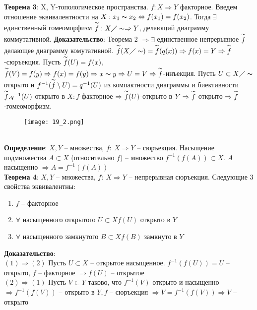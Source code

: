 	\textbf{Теорема 3}: X, Y-топологическое  пространства. $f: X \Rightarrow Y$ факторное. Введем отношение эквивалентности на $X: x_1 \thicksim x_2 \Leftrightarrow f(x_1) = f(x_2)$. Тогда $\exists$ единственный гомеоморфизм $\overset{\thicksim}{f} : X\diagup \thicksim \Rightarrow Y$, делающий диаграмму коммутативной.
	\textbf{Доказательство}: Теорема 2 $\Rightarrow \exists$ единственное непрерывное $\overset{\thicksim}{f}$ делающее диаграмму комутативной. $\overset{\thicksim}{f}(X\diagup \thicksim)=\overset{\thicksim}{f}(q(x)) \Rightarrow f(x) = Y \Rightarrow \overset{\thicksim}{f}$-сюръекция. Пусть $\overset{\thicksim}{f}(U)=f(x)$, $\overset{\thicksim}{f}(V) = f(y) \Rightarrow f(x) =f(y) \Rightarrow x\thicksim y \Rightarrow U=V \Rightarrow \overset{\thicksim}{f}$-инъекция. Пусть $U\subset X\diagup \thicksim$ открыто и $f^{-1}(\overset{\thicksim}{f}\setminus U)=q^{-1}(U)$ из компактности диаграммы и биективности $\overset{\thicksim}{f}. q^{-1}(U)$ открыто в $X: f$-факторное $\Rightarrow \overset{\thicksim}{f}(U)$-открыто в $Y \Rightarrow \overset{\thicksim}{f}$ открыто $\Rightarrow \overset{\thicksim}{f}$-гомеоморфизм.\\
	\begin{figure}[h!]
		\centering
		\texttt{[image: 19\_2.png]}
	\end{figure}\\
	\textbf{Определение}: $X,Y$ -- множества, $f:\ X \Rightarrow Y$ -- сюръекция. Насыщение подмножества $A\subset X$ (относительно $f$) -- множество $f^{-1}(f(A))\subset X$. $A$ насыщенно $\Rightarrow A = f^{-1}(f(A))$\\
	\textbf{Теорема 4}: $X,Y$ -- множества, $f:\ X \Rightarrow Y$ -- непрерывная сюръекция. Следующие 3 свойства эквивалентны:\\
	\begin{enumerate}
		\item 
		$f$ -- факторное
		\item 
		$\forall $ насыщенного открытого $U \subset X f(U)$ открыто в $Y$
		\item 
		$\forall $ насыщенного замкнутого $B \subset X f(B)$ замкнуто в $Y$
	\end{enumerate}
	\textbf{Доказательство}:\\
	$(1) \Rightarrow (2)$ Пусть $U\subset X$ -- открытое насыщенное. $f^{-1}(f(U)) = U$ -- открыто, $f$ -- факторное $\Rightarrow f(U)$ -- открытое \\
	$(2) \Rightarrow (1)$ Пусть $V\subset Y$ таково, что $f^{-1}(V)$ открыто и насыщенно $\Rightarrow f^{-1}(f(V))$ -- открыто в $Y, f$ -- сюръекция $\Rightarrow V=f^{-1}(f(V)) \Rightarrow V$ -- открыто\\
